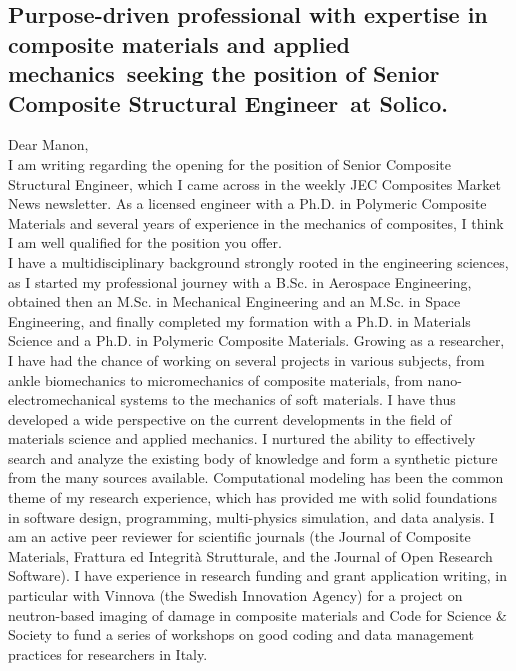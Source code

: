 \documentclass[
  a4paper, 
]{fortysecondscv}
\def\expertise{composite materials and applied mechanics}
\def\position{the position of Senior Composite Structural Engineer}
\def\company{Solico}
\def\reference{}
\def\salutation{Manon}
\begin{document}
\makefrontsidebar

\cvsignature
\vspace*{12pt}
\subsection{\textbf{Purpose-driven professional with expertise in \expertise\ seeking \position\ at \company\reference.}}
\vspace*{12pt}
Dear \salutation,\\[6pt]
I am writing regarding the opening for the position of Senior Composite Structural Engineer, which I came across in the weekly JEC Composites Market News newsletter. As a licensed engineer with a Ph.D. in Polymeric Composite Materials and several years of experience in the mechanics of composites, I think I am well qualified for the position you offer.\\[8pt]
I have a multidisciplinary background strongly rooted in the engineering sciences, as I started my professional journey with a B.Sc. in Aerospace Engineering, obtained then an M.Sc. in Mechanical Engineering and an M.Sc. in Space Engineering, and finally completed my formation with a Ph.D. in Materials Science and a Ph.D. in Polymeric Composite Materials. Growing as a researcher, I have had the chance of working on several projects in various subjects, from ankle biomechanics to micromechanics of composite materials, from nano-electromechanical systems to the mechanics of soft materials. I have thus developed a wide perspective on the current developments in the field of materials science and applied mechanics. I nurtured the ability to effectively search and analyze the existing body of knowledge and form a synthetic picture from the many sources available. Computational modeling has been the common theme of my research experience, which has provided me with solid foundations in software design, programming, multi-physics simulation, and data analysis. I am an active peer reviewer for scientific journals (the Journal of Composite Materials, Frattura ed Integrità Strutturale, and the Journal of Open Research Software). I have experience in research funding and grant application writing, in particular with Vinnova (the Swedish Innovation Agency) for a project on neutron-based imaging of damage in composite materials and Code for Science \& Society to fund a series of workshops on good coding and data management practices for researchers in Italy.\\[8pt]
\end{document}
